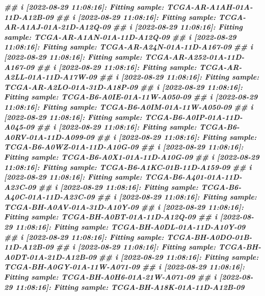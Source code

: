 \documentclass[
  12pt,
  a4paper,
  twoside]{book}
\newenvironment{Shaded}{\begin{snugshade}}{\end{snugshade}}
\newcommand{\DocumentationTok}[1]{\textcolor[rgb]{0.56,0.35,0.01}{\textbf{\textit{#1}}}}
\begin{document}
\begin{Shaded}
\begin{Highlighting}[]
\DocumentationTok{\#\# i [2022{-}08{-}29 11:08:16]: Fitting sample: TCGA{-}AR{-}A1AH{-}01A{-}11D{-}A12B{-}09}
\DocumentationTok{\#\# i [2022{-}08{-}29 11:08:16]: Fitting sample: TCGA{-}AR{-}A1AJ{-}01A{-}21D{-}A12Q{-}09}
\DocumentationTok{\#\# i [2022{-}08{-}29 11:08:16]: Fitting sample: TCGA{-}AR{-}A1AN{-}01A{-}11D{-}A12Q{-}09}
\DocumentationTok{\#\# i [2022{-}08{-}29 11:08:16]: Fitting sample: TCGA{-}AR{-}A24N{-}01A{-}11D{-}A167{-}09}
\DocumentationTok{\#\# i [2022{-}08{-}29 11:08:16]: Fitting sample: TCGA{-}AR{-}A252{-}01A{-}11D{-}A167{-}09}
\DocumentationTok{\#\# i [2022{-}08{-}29 11:08:16]: Fitting sample: TCGA{-}AR{-}A2LL{-}01A{-}11D{-}A17W{-}09}
\DocumentationTok{\#\# i [2022{-}08{-}29 11:08:16]: Fitting sample: TCGA{-}AR{-}A2LO{-}01A{-}31D{-}A18P{-}09}
\DocumentationTok{\#\# i [2022{-}08{-}29 11:08:16]: Fitting sample: TCGA{-}B6{-}A0IE{-}01A{-}11W{-}A050{-}09}
\DocumentationTok{\#\# i [2022{-}08{-}29 11:08:16]: Fitting sample: TCGA{-}B6{-}A0IM{-}01A{-}11W{-}A050{-}09}
\DocumentationTok{\#\# i [2022{-}08{-}29 11:08:16]: Fitting sample: TCGA{-}B6{-}A0IP{-}01A{-}11D{-}A045{-}09}
\DocumentationTok{\#\# i [2022{-}08{-}29 11:08:16]: Fitting sample: TCGA{-}B6{-}A0RV{-}01A{-}11D{-}A099{-}09}
\DocumentationTok{\#\# i [2022{-}08{-}29 11:08:16]: Fitting sample: TCGA{-}B6{-}A0WZ{-}01A{-}11D{-}A10G{-}09}
\DocumentationTok{\#\# i [2022{-}08{-}29 11:08:16]: Fitting sample: TCGA{-}B6{-}A0X1{-}01A{-}11D{-}A10G{-}09}
\DocumentationTok{\#\# i [2022{-}08{-}29 11:08:16]: Fitting sample: TCGA{-}B6{-}A1KC{-}01B{-}11D{-}A159{-}09}
\DocumentationTok{\#\# i [2022{-}08{-}29 11:08:16]: Fitting sample: TCGA{-}B6{-}A401{-}01A{-}11D{-}A23C{-}09}
\DocumentationTok{\#\# i [2022{-}08{-}29 11:08:16]: Fitting sample: TCGA{-}B6{-}A40C{-}01A{-}11D{-}A23C{-}09}
\DocumentationTok{\#\# i [2022{-}08{-}29 11:08:16]: Fitting sample: TCGA{-}BH{-}A0AV{-}01A{-}31D{-}A10Y{-}09}
\DocumentationTok{\#\# i [2022{-}08{-}29 11:08:16]: Fitting sample: TCGA{-}BH{-}A0BT{-}01A{-}11D{-}A12Q{-}09}
\DocumentationTok{\#\# i [2022{-}08{-}29 11:08:16]: Fitting sample: TCGA{-}BH{-}A0DL{-}01A{-}11D{-}A10Y{-}09}
\DocumentationTok{\#\# i [2022{-}08{-}29 11:08:16]: Fitting sample: TCGA{-}BH{-}A0DO{-}01B{-}11D{-}A12B{-}09}
\DocumentationTok{\#\# i [2022{-}08{-}29 11:08:16]: Fitting sample: TCGA{-}BH{-}A0DT{-}01A{-}21D{-}A12B{-}09}
\DocumentationTok{\#\# i [2022{-}08{-}29 11:08:16]: Fitting sample: TCGA{-}BH{-}A0GY{-}01A{-}11W{-}A071{-}09}
\DocumentationTok{\#\# i [2022{-}08{-}29 11:08:16]: Fitting sample: TCGA{-}BH{-}A0H6{-}01A{-}21W{-}A071{-}09}
\DocumentationTok{\#\# i [2022{-}08{-}29 11:08:16]: Fitting sample: TCGA{-}BH{-}A18K{-}01A{-}11D{-}A12B{-}09}

\end{Highlighting}
\end{Shaded}
\end{document}
